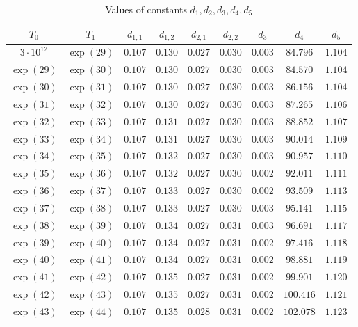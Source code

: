 \documentclass[reqno]{amsart}
\numberwithin{equation}{section}
\theoremstyle{remark}
\begin{document}
\begin{table}[h]
\def\arraystretch{1.3}
\centering
\caption{Values of constants $d_1,d_2,d_3,d_4,d_5$ }
\begin{tabular}{|c|c|c|c|c|c|c|c|c|}
\hline
$T_0$ & $T_1$ & $d_{1,1}$ & $d_{1,2}$ & $d_{2,1}$ & $d_{2,2}$ & $d_3$ & $d_4$ & $d_5$  \\
\hline
$3\cdot 10^{12} $ & $\exp(29)$ & $0.107$ & $0.130$ & $0.027$ & $0.030$ & $0.003$ & $84.796$&$1.104$\\
\hline
$\exp(29)$ & $\exp(30)$ & $0.107$ & $0.130$& $0.027$& $0.030$& $0.003$& $84.570$& $1.104$ \\
\hline
$\exp(30)$ & $\exp(31)$ & $0.107$ & $0.130$& $0.027$& $0.030$& $0.003$& $86.156$& $1.104$ \\
\hline
$\exp(31)$ & $\exp(32)$ & $0.107$ & $0.130$& $0.027$& $0.030$& $0.003$& $87.265$& $1.106$ \\
\hline
$\exp(32)$ & $\exp(33)$ & $0.107$ & $0.131$& $0.027$& $0.030$& $0.003$& $88.852$& $1.107$ \\
\hline
$\exp(33)$ & $\exp(34)$ & $0.107$ & $0.131$& $0.027$& $0.030$& $0.003$& $90.014$& $1.109$ \\
\hline
$\exp(34)$ & $\exp(35)$ & $0.107$ & $0.132$& $0.027$& $0.030$& $0.003$& $90.957$& $1.110$ \\
\hline
$\exp(35)$ & $\exp(36)$ & $0.107$ & $0.132$& $0.027$& $0.030$& $0.002$& $92.011$& $1.111$ \\
\hline
$\exp(36)$ & $\exp(37)$ & $0.107$ & $0.133$& $0.027$& $0.030$& $0.002$& $93.509$& $1.113$ \\
\hline
$\exp(37)$ & $\exp(38)$ & $0.107$ & $0.133$& $0.027$& $0.030$& $0.003$& $95.141$& $1.115$ \\
\hline
$\exp(38)$ & $\exp(39)$ & $0.107$ & $0.134$& $0.027$& $0.031$& $0.003$& $96.691$& $1.117$ \\
\hline
$\exp(39)$ & $\exp(40)$ & $0.107$ & $0.134$& $0.027$& $0.031$& $0.002$& $97.416$& $1.118$ \\
\hline
$\exp(40)$ & $\exp(41)$ & $0.107$ & $0.134$& $0.027$& $0.031$& $0.002$& $98.881$& $1.119$ \\
\hline
$\exp(41)$ & $\exp(42)$ & $0.107$ & $0.135$& $0.027$& $0.031$& $0.002$& $99.901$& $1.120$ \\
\hline
$\exp(42)$ & $\exp(43)$ & $0.107$ & $0.135$& $0.027$& $0.031$& $0.002$& $100.416$& $1.121$ \\
\hline
$\exp(43)$ & $\exp(44)$ & $0.107$ & $0.135$& $0.028$& $0.031$& $0.002$& $102.078$& $1.123$ \\

\end{tabular}
\end{table}
\end{document}

